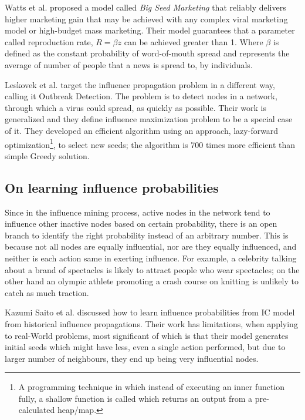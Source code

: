 		Watts et al. \cite{watts2007b} proposed a model called \textit{Big Seed Marketing} that reliably delivers higher marketing gain that may be achieved with any complex viral marketing model or high-budget mass marketing. Their model guarantees that a parameter called reproduction rate, $R=\beta z$ can be achieved greater than 1. Where $\beta$ is defined as the constant probability of word-of-mouth spread and represents the average of number of people that a news is spread to, by individuals.
	
		Leskovek et al. \cite{leskovec2007b} target the influence propagation problem in a different way, calling it Outbreak Detection. The problem is to detect nodes in a network, through which a virus could spread, as quickly as possible. Their work is generalized and they define influence maximization problem to be a special case of it. They developed an efficient algorithm using an approach, lazy-forward optimization\footnote{A programming technique in which instead of executing an inner function fully, a shallow function is called which returns an output from a pre-calculated heap/map.}, to select new seeds; the algorithm is 700 times more efficient than simple Greedy solution.


		\subsection{On learning influence probabilities}
		Since in the influence mining process, active nodes in the network tend to influence other inactive nodes based on certain probability, there is an open branch to identify the right probability instead of an arbitrary number. This is because not all nodes are equally influential, nor are they equally influenced, and neither is each action same in exerting influence. For example, a celebrity talking about a brand of spectacles is likely to attract people who wear spectacles; on the other hand an olympic athlete promoting a crash course on knitting is unlikely to catch as much traction.
		
		Kazumi Saito et al. \cite{saito2008} discussed how to learn influence probabilities from IC model from historical influence propagations. Their work has limitations, when applying to real-World problems, most significant of which is that their model generates initial seeds which might have less, even a single action performed, but due to larger number of neighbours, they end up being very influential nodes.
		
